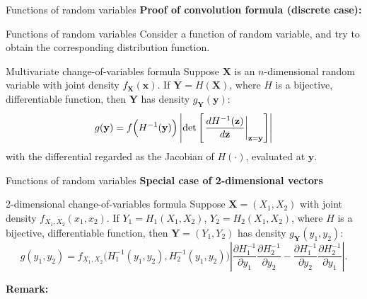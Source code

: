 \documentclass [aspectratio=169]{beamer}
\begin{document}
\begin{frame}{Functions of random variables}
\textbf{Proof of convolution formula (discrete case):}
\vspace{2.5in}
\end{frame}


\begin{frame}{Functions of random variables}
Consider a function of random variable, and try to obtain the corresponding distribution function.
    \begin{block}{Multivariate change-of-variables formula}
    Suppose $\mathbf{X}$ is an $n$-dimensional random variable with joint density $f_{\mathbf{X}}(\mathbf{x})$. If $\mathbf{Y} = H(\mathbf{X})$, where $H$ is a bijective, differentiable function, then $\mathbf{Y}$ has density $g_\mathbf{Y}(\mathbf{y})$:
    $$
    {\displaystyle g(\mathbf {y} )=f{\Bigl (}H^{-1}(\mathbf {y} ){\Bigr )}\left|\det \left[\left.{\frac {dH^{-1}(\mathbf {z} )}{d\mathbf {z} }}\right|_{\mathbf {z} =\mathbf {y} }\right]\right|}
    $$
with the differential regarded as the Jacobian of $H(\cdot)$, evaluated at $\mathbf{y}$.
\end{block}
\vspace{0.1in}
\end{frame}

\begin{frame}{Functions of random variables}
\textbf{Special case of 2-dimensional vectors}
    \begin{block}{2-dimensional change-of-variables formula}
    Suppose $\mathbf{X} = (X_1, X_2)$ with joint density $f_{X_1, X_2}(x_1, x_2)$. If $Y_1 = H_1(X_1, X_2)$, $Y_2 = H_2(X_1, X_2)$, where $H$ is a bijective, differentiable function, then $\mathbf{Y} = (Y_1, Y_2)$ has density $g_\mathbf{Y}(y_1, y_2)$:
    $$
    {\displaystyle g(y_{1},y_{2})=f_{X_{1},X_{2}}{\big (}H_{1}^{-1}(y_{1},y_{2}),H_{2}^{-1}(y_{1},y_{2}){\big )}\left\vert {\frac {\partial H_{1}^{-1}}{\partial y_{1}}}{\frac {\partial H_{2}^{-1}}{\partial y_{2}}}-{\frac {\partial H_{1}^{-1}}{\partial y_{2}}}{\frac {\partial H_{2}^{-1}}{\partial y_{1}}}\right\vert .}
    $$
\end{block}
\vspace{0.1in}
\textbf{Remark:}\\
\vspace{0.1in}
\end{frame}
\end{document}
